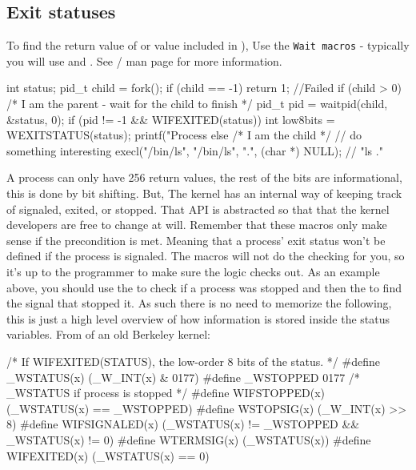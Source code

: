 \subsection{Exit statuses}

To find the return value of  or value included in ), Use the \texttt{Wait macros} - typically you will use  and  . See / man page for more information.

\begin{code}[language=C][language=C]
int status;
pid_t child = fork();
if (child == -1) return 1; //Failed
if (child > 0) { /* I am the parent - wait for the child to finish */
  pid_t pid = waitpid(child, &status, 0);
  if (pid != -1 && WIFEXITED(status)) {
     int low8bits = WEXITSTATUS(status);
     printf("Process %
  }
} else { /* I am the child */
 // do something interesting
  execl("/bin/ls", "/bin/ls", ".", (char *) NULL); // "ls ."
}
\end{code}

A process can only have 256 return values, the rest of the bits are informational, this is done by bit shifting. But, The kernel has an internal way of keeping track of signaled, exited, or stopped. That API is abstracted so that that the kernel developers are free to change at will. Remember that these macros only make sense if the precondition is met. Meaning that a process' exit status won't be defined if the process is signaled. The macros will not do the checking for you, so it's up to the programmer to make sure the logic checks out. As an example above, you should use the  to check if a process was stopped and then the  to find the signal that stopped it. As such there is no need to memorize the following, this is just a high level overview of how information is stored inside the status variables. From  of an old Berkeley kernel\cite{sys/wait.h}:

\begin{code}[language=C][language=C]
/* If WIFEXITED(STATUS), the low-order 8 bits of the status. */
#define _WSTATUS(x) (_W_INT(x) & 0177)
#define _WSTOPPED 0177    /* _WSTATUS if process is stopped */
#define WIFSTOPPED(x) (_WSTATUS(x) == _WSTOPPED)
#define WSTOPSIG(x) (_W_INT(x) >> 8)
#define WIFSIGNALED(x)  (_WSTATUS(x) != _WSTOPPED && _WSTATUS(x) != 0)
#define WTERMSIG(x) (_WSTATUS(x))
#define WIFEXITED(x)  (_WSTATUS(x) == 0)
\end{code}

